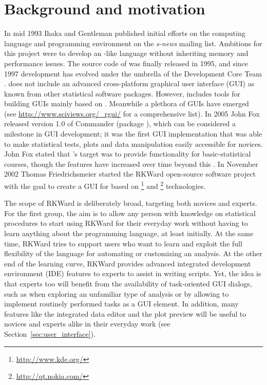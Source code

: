 \section{Background and motivation}
\label{background}
In mid 1993 Ihaka and Gentleman published initial efforts on the computing
language and programming environment  on the \emph{s-news} mailing list. Ambitions for
this project were to develop an -like language without inheriting memory
and performance issues. The source code of  was finally released in 1995, and 
since 1997 development has evolved under the umbrella of the  
Development Core Team \citep{RDCT2001, RDCT2010, Ihaka_Gentlemen_1993}.
 does not include an advanced cross-platform graphical user interface (GUI) as known from other
statistical software packages. However,  includes tools for building GUIs
mainly based on  \citep{Dalgaard2001, Dalgaard2002}. Meanwhile a
plethora of  GUIs have emerged (see \url{http://www.sciviews.org/_rgui/} for a
comprehensive list). In 2005 John Fox released version 1.0 of  Commander (package ), which
can be considered a milestone in  GUI development; it was the first GUI
implementation that was able to make statistical tests,
plots and data manipulation easily accessible for  novices.
John Fox stated that 's target was to provide
functionality for basic-statistical courses, though the features have increased over
time beyond this \citep{Fox2005, Fox2007}. In November 2002 Thomas Friedrichsmeier
started the RKWard open-source software project with the goal to create a GUI for
 based on \footnote{\url{http://www.kde.org/}} and \footnote{\url{http://qt.nokia.com/}} technologies.

The scope of RKWard is deliberately broad, targeting both  novices and experts.
For the first group, the aim is to allow any person with knowledge on
statistical procedures to start using RKWard for their everyday work 
without having to learn anything about the  programming language,
at least initially. At the same time, RKWard tries to support users who want to learn and
exploit the full flexibility of the  language for automating or customizing
an analysis. At the other end of the learning curve, RKWard provides advanced integrated development environment (IDE)
features to  experts to assist in writing  scripts. Yet, the idea
is that  experts too will benefit from the availability of task-oriented GUI
dialogs, such as when exploring an unfamiliar type of analysis
or by allowing to implement routinely performed tasks as a GUI element. In
addition, many features like the integrated data editor and the plot preview 
will be useful to  novices and  experts alike in their everyday work
(see Section~\ref{sec:user_interface}).

